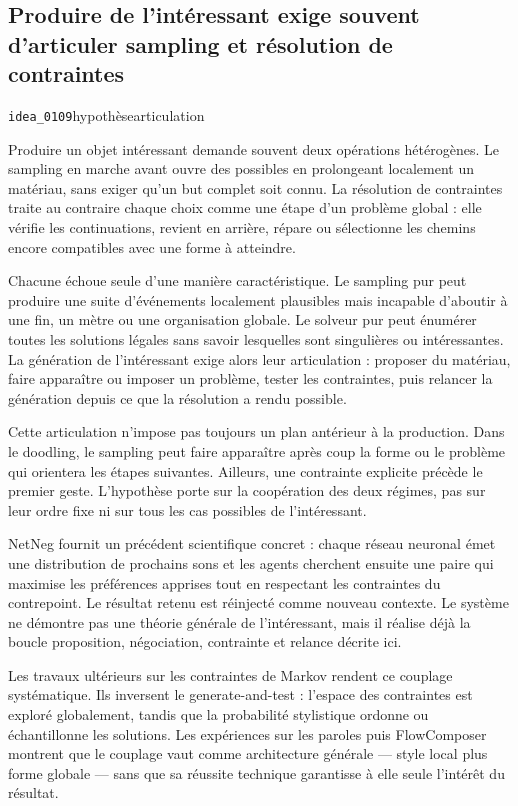 \documentclass[10pt,a4paper]{article}
\begin{document}
\subsection{Produire de l'intéressant exige souvent d'articuler sampling et résolution de contraintes}
{\small\color{metadata} \texttt{idea\_0109}\quad\textbullet\quad hypothèse\quad\textbullet\quad articulation\par}

Produire un objet intéressant demande souvent deux opérations hétérogènes. Le sampling en marche avant ouvre des possibles en prolongeant localement un matériau, sans exiger qu'un but complet soit connu. La résolution de contraintes traite au contraire chaque choix comme une étape d'un problème global : elle vérifie les continuations, revient en arrière, répare ou sélectionne les chemins encore compatibles avec une forme à atteindre.

Chacune échoue seule d'une manière caractéristique. Le sampling pur peut produire une suite d'événements localement plausibles mais incapable d'aboutir à une fin, un mètre ou une organisation globale. Le solveur pur peut énumérer toutes les solutions légales sans savoir lesquelles sont singulières ou intéressantes. La génération de l'intéressant exige alors leur articulation : proposer du matériau, faire apparaître ou imposer un problème, tester les contraintes, puis relancer la génération depuis ce que la résolution a rendu possible.

Cette articulation n'impose pas toujours un plan antérieur à la production. Dans le doodling, le sampling peut faire apparaître après coup la forme ou le problème qui orientera les étapes suivantes. Ailleurs, une contrainte explicite précède le premier geste. L'hypothèse porte sur la coopération des deux régimes, pas sur leur ordre fixe ni sur tous les cas possibles de l'intéressant.

NetNeg fournit un précédent scientifique concret : chaque réseau neuronal émet une distribution de prochains sons et les agents cherchent ensuite une paire qui maximise les préférences apprises tout en respectant les contraintes du contrepoint. Le résultat retenu est réinjecté comme nouveau contexte. Le système ne démontre pas une théorie générale de l'intéressant, mais il réalise déjà la boucle proposition, négociation, contrainte et relance décrite ici.

Les travaux ultérieurs sur les contraintes de Markov rendent ce couplage systématique. Ils inversent le generate-and-test : l'espace des contraintes est exploré globalement, tandis que la probabilité stylistique ordonne ou échantillonne les solutions. Les expériences sur les paroles puis FlowComposer montrent que le couplage vaut comme architecture générale — style local plus forme globale — sans que sa réussite technique garantisse à elle seule l'intérêt du résultat.
\end{document}
